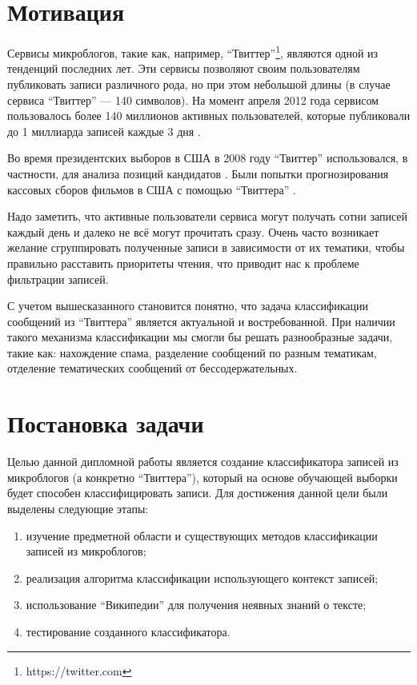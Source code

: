\intro

\section{Мотивация}
Сервисы микроблогов, такие как, например, ``Твиттер''\footnote{https://twitter.com}, являются одной из тенденций последних лет. Эти сервисы позволяют своим пользователям публиковать записи различного рода, но при этом небольшой длины (в случае сервиса ``Твиттер'' --- 140 символов). На момент апреля 2012 года сервисом пользовалось более 140 миллионов активных пользователей, которые публиковали до 1 миллиарда записей каждые 3 дня \cite{web:twitter-users}. 

Во время президентских выборов в США в 2008 году ``Твиттер'' использовался, в частности, для анализа позиций кандидатов \cite{Diakopoulos:2010:CDP:1753326.1753504}. Были попытки прогнозирования кассовых сборов фильмов в США с помощью ``Твиттера'' \cite{DBLP:journals/corr/abs-1003-5699}. 

Надо заметить, что активные пользователи сервиса могут получать сотни записей каждый день и далеко не всё могут прочитать сразу. Очень часто возникает желание сгруппировать полученные записи в зависимости от их тематики, чтобы  правильно расставить приоритеты чтения, что приводит нас к проблеме фильтрации записей.

С учетом вышесказанного становится понятно, что задача классификации сообщений из ``Твиттера'' является актуальной и востребованной. При наличии такого механизма классификации мы смогли бы решать разнообразные задачи, такие как: нахождение спама, разделение сообщений по разным тематикам, отделение тематических сообщений от бессодержательных. 

\section{Постановка задачи}
Целью данной дипломной работы является создание классификатора записей из микроблогов (а конкретно ``Твиттера''), который на основе обучающей выборки будет способен классифицировать записи. Для достижения данной цели были выделены следующие этапы: 
\begin{enumerate}
    \item изучение предметной области и существующих методов классификации записей из микроблогов;
    \item реализация алгоритма классификации использующего контекст записей;
    \item использование ``Википедии'' для получения неявных знаний о тексте;
    \item тестирование созданного классификатора.
\end{enumerate}

